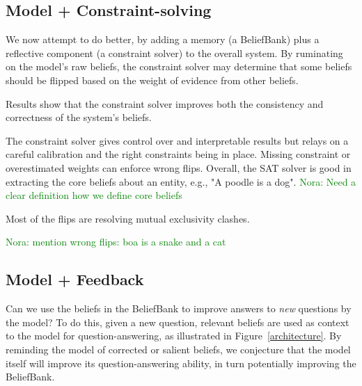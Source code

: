 \documentclass[11pt]{article}
\newcommand{\nk}[1]{\textcolor{green}{Nora: #1}}
\newcommand{\eat}[1]{}
\begin{document}
{\subsection{Model + Constraint-solving}


We now attempt to do better, by adding a memory (a BeliefBank) plus a reflective component (a constraint solver)
to the overall system. By ruminating on the model's raw beliefs, the constraint solver may determine
that some beliefs should be flipped based on the weight of evidence from other beliefs. \eat{We refer
to the combination of the model plus memory (BeliefBank) as ``the system'', whose beliefs are those
in the maintained BeliefBank.}

Results show that the constraint solver improves both the consistency and correctness
of the system's beliefs.

The constraint solver gives control over and interpretable results but relays on a careful calibration and the right constraints being in place.
Missing constraint or overestimated weights can enforce wrong flips. Overall, the SAT solver is good in extracting the core beliefs about an entity, e.g., "A poodle is a dog". \nk{Need a clear definition how we define core beliefs}

Most of the flips are resolving mutual exclusivity clashes. 

\nk{mention wrong flips: boa is a snake and a cat}


\subsection{Model + Feedback}

Can we use the beliefs in the BeliefBank to improve answers to {\it new} questions by the model?
To do this, given a new question, relevant beliefs are used as 
context to the model for question-answering, as illustrated in Figure~\ref{architecture}. 
By reminding the model of corrected or salient beliefs, we conjecture that the model itself
will improve its question-answering ability, in turn potentially improving the
BeliefBank.

}
\end{document}

